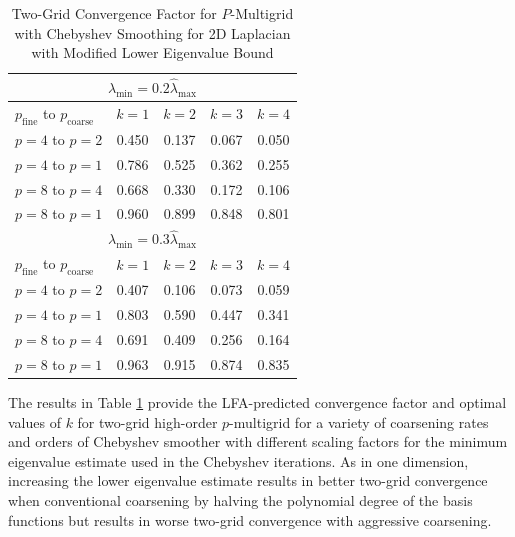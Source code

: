 \begin{table}[ht!]
\begin{center}
\begin{tabular}{l c c c c}
  \toprule
  \multicolumn{5}{c}{$\lambda_{\min} = 0.2 \hat{\lambda}_{\max}$} \\
  \toprule
  $p_{\text{fine}}$ to $p_{\text{coarse}}$  &  $k = 1$   &  $k = 2$   &  $k = 3$   &  $k = 4$   \\
  \toprule
  $p = 4$ to $p = 2$   &  0.450  &  0.137  &  0.067  &  0.050  \\
  $p = 4$ to $p = 1$   &  0.786  &  0.525  &  0.362  &  0.255  \\
  \midrule
  $p = 8$ to $p = 4$   &  0.668  &  0.330  &  0.172  &  0.106  \\
  $p = 8$ to $p = 1$   &  0.960  &  0.899  &  0.848  &  0.801  \\
  \toprule
  \multicolumn{5}{c}{$\lambda_{\min} = 0.3 \hat{\lambda}_{\max}$} \\
  \toprule
  $p_{\text{fine}}$ to $p_{\text{coarse}}$  &  $k = 1$   &  $k = 2$   &  $k = 3$   &  $k = 4$   \\
  \toprule
  $p = 4$ to $p = 2$   &  0.407  &  0.106  &  0.073  &  0.059  \\
  $p = 4$ to $p = 1$   &  0.803  &  0.590  &  0.447  &  0.341  \\
  \midrule
  $p = 8$ to $p = 4$   &  0.691  &  0.409  &  0.256  &  0.164  \\
  $p = 8$ to $p = 1$   &  0.963  &  0.915  &  0.874  &  0.835  \\
  \bottomrule
\end{tabular}
\end{center}
\caption{Two-Grid Convergence Factor for $P$-Multigrid with Chebyshev Smoothing for 2D Laplacian with Modified Lower Eigenvalue Bound}
\label{table:two_grid_2d_chebyshev_eigenvalues}
\end{table}

The results in Table \ref{table:two_grid_2d_chebyshev_eigenvalues} provide the LFA-predicted convergence factor and optimal values of $k$ for two-grid high-order $p$-multigrid for a variety of coarsening rates and orders of Chebyshev smoother with different scaling factors for the minimum eigenvalue estimate used in the Chebyshev iterations.
As in one dimension, increasing the lower eigenvalue estimate results in better two-grid convergence when conventional coarsening by halving the polynomial degree of the basis functions but results in worse two-grid convergence with aggressive coarsening.

